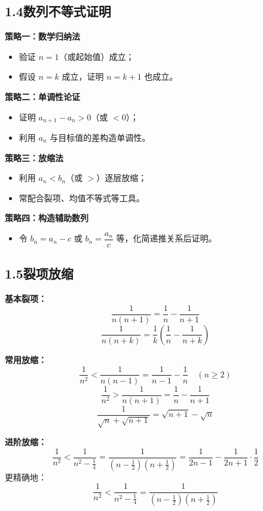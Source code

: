 \documentclass[12pt, a4paper]{ctexart}
\begin{document}
\subsection*{1.4\quad 数列不等式证明}

\begin{knowledgebox}[常用证明策略]
\textbf{策略一：数学归纳法}
\begin{itemize}[nosep]
\item 验证 $n=1$（或起始值）成立；
\item 假设 $n=k$ 成立，证明 $n=k+1$ 也成立。
\end{itemize}

\textbf{策略二：单调性论证}
\begin{itemize}[nosep]
\item 证明 $a_{n+1} - a_n > 0$（或 $< 0$）；
\item 利用 $a_n$ 与目标值的差构造单调性。
\end{itemize}

\textbf{策略三：放缩法}
\begin{itemize}[nosep]
\item 利用 $a_n < b_n$（或 $>$）逐层放缩；
\item 常配合裂项、均值不等式等工具。
\end{itemize}

\textbf{策略四：构造辅助数列}
\begin{itemize}[nosep]
\item 令 $b_n = a_n - c$ 或 $b_n = \dfrac{a_n}{c}$ 等，化简递推关系后证明。
\end{itemize}
\end{knowledgebox}

\subsection*{1.5\quad 裂项放缩}

\begin{knowledgebox}[裂项放缩核心公式]
\textbf{基本裂项：}
\[
\frac{1}{n(n+1)} = \frac{1}{n} - \frac{1}{n+1}
\]
\[
\frac{1}{n(n+k)} = \frac{1}{k}\left(\frac{1}{n} - \frac{1}{n+k}\right)
\]

\textbf{常用放缩：}
\[
\frac{1}{n^2} < \frac{1}{n(n-1)} = \frac{1}{n-1} - \frac{1}{n} \quad (n\geq 2)
\]
\[
\frac{1}{n^2} > \frac{1}{n(n+1)} = \frac{1}{n} - \frac{1}{n+1}
\]
\[
\frac{1}{\sqrt{n} + \sqrt{n+1}} = \sqrt{n+1} - \sqrt{n}
\]

\textbf{进阶放缩：}
\[
\frac{1}{n^2} < \frac{1}{n^2 - \frac{1}{4}} = \frac{1}{\left(n-\frac{1}{2}\right)\left(n+\frac{1}{2}\right)} = \frac{1}{2n-1} - \frac{1}{2n+1} \cdot \frac{1}{2}
\]
更精确地：
\[
\frac{1}{n^2} < \frac{1}{n^2 - \frac{1}{4}} = \frac{1}{\left(n-\frac{1}{2}\right)\left(n+\frac{1}{2}\right)}
\]
\end{knowledgebox}
\end{document}
